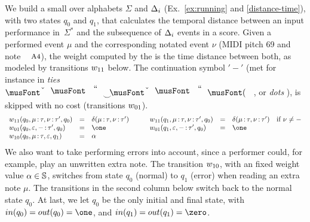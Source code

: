 \begin{example}\label{ex:SWT}
We build a small \SWT over  alphabets $\Sigma$ and $\Deltai$
(Ex.~\ref{ex:running} and \ref{distance-time}),
with two states $q_0$ and $q_1$, that
calculates the temporal distance between an input performance in~$\Sigma^*$
and the subsequence
of $\Deltai$ events in a score.
%
Given  a performed event $\mu$
and the corresponding notated event $\nu$
(\eg MIDI pitch 69 and note $\mbox{\footnotesize A4}$),
the weight  computed by the \SWT is the time distance between both,
as modeled by transitions $\wei_{11}$ below.
%
The continuation symbol $'-'$
(met for instance in \emph{ties}
$\musQuarter\!\!\!\mathrel{\raisebox{-1.5mm}{$\smile$}}\!\!\!\musEighth$,
or \emph{dots} \musQuarterDotted{}),
is  skipped with no cost (transitions $\wei_{01}$).
\[
\begin{array}{lclclcll}
\wei_{11}(q_0, \mu\ts{\tau}, \nu\ts{\tau'}, q_0) & = &
     \delta(\mu\ts{\tau}, \nu\ts{\tau'}) & \quad & %
\wei_{11}(q_1, \mu\ts{\tau}, \nu\ts{\tau'}, q_0) & = &
     \delta(\mu\ts{\tau}, \nu\ts{\tau'}) &
     \mbox{if~} \nu \neq - \\ %
\wei_{01}(q_0, \varepsilon, \mathsf{-}\ts{\tau'}, q_0) & = & \one & &
\wei_{01}(q_1, \varepsilon, \mathsf{-}\ts{\tau'}, q_0) & = & \one\\
\wei_{10}(q_0, \mu\ts{\tau}, \varepsilon, q_1) & = & \alpha & & %
\end{array}
\]
%
We also want to take performing errors into account,
since a performer could, for example, play an unwritten extra note.
%
The transition $\wei_{10}$,
with an fixed weight value $\alpha \in \mathbb{S}$,
switches from state $q_0$ (normal) to $q_1$ (error)
when reading an extra note $\mu$.
The transitions in the second column below switch back to the normal state $q_0$.
At last, we let $q_0$ be the only initial and final state, with
$\init(q_0) = \final(q_0) = \one$, and
$\init(q_1) = \final(q_1) = \zero$.
\endex
\end{example}

